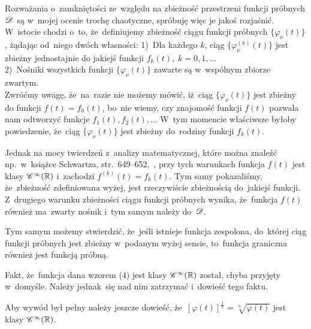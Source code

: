 \documentclass[a4paper,11pt]{article}
\begin{document}
\start {} Rozważania o~zamkniętości ze~względu na zbieżność
przestrzeni funkcji próbnych $\mathcal{D}$~są w~mojej ocenie trochę
chaotyczne, spróbuję więc je jakoś rozjaśnić. W~istocie chodzi o~to,
że~definiujemy zbieżność ciągu funkcji próbnych
$\{ \varphi_{ \nu }( t ) \}$, żądając od~niego dwóch własności:
1)~Dla każdego $k$, ciąg $\{ \varphi_{ \nu }^{ ( k ) }( t ) \}$ jest
zbieżny jednostajnie do jakiejś funkcji
$f_{ k }( t ), \; k = 0, 1, \ldots$ \\
2)~Nośniki wszystkich funkcji $\{ \varphi_{ \nu }( t ) \}$ zawarte są
w~wspólnym zbiorze zwartym. \\
Zwróćmy uwagę, że~na~razie nie możemy mówić, iż~ciąg
$\{ \varphi_{ \nu }( t ) \}$ jest zbieżny do funkcji
$f( t ) = f_{ 0 }( t )$, bo~nie wiemy, czy znajomość funkcji $f( t )$
pozwala nam odtworzyć funkcje $f_{ 1 }( t ), f_{ 2 }( t ), \ldots$ W~tym
momencie właściwsze byłoby powiedzenie, że~ciąg
$\{ \varphi_{ \nu }( t ) \}$ jest zbieżny do~rodziny funkcji
$f_{ k }( t )$.

Jednak na mocy twierdzeń z~analizy matematycznej, które można znaleźć
np.~w~książce Schwartza, str.~649--652,~\cite{SchwartzKursAnalizyMatematycznejVolI1979}, przy tych
warunkach funkcja $f( t )$ jest klasy $\mathcal{C}^{ \infty }( \mathbb{R} )$ i~zachodzi
$f^{ ( k ) }( t ) = f_{ k }( t )$. Tym samy pokazaliśmy, że~zbieżność
zdefiniowana wyżej, jest rzeczywiście zbieżnością do~jakiejś funkcji.
Z~drugiego warunku zbieżności ciągu funkcji próbnych wynika,
że~funkcja $f( t )$ również ma~zwarty nośnik i~tym samym należy
do~$\mathcal{D}$.

Tym samym możemy stwierdzić, że~jeśli istnieje funkcja zespolona,
do~której ciąg funkcji próbnych jest zbieżny w~podanym wyżej sensie,
to~funkcja graniczna również jest funkcją próbną.

\vspace{\spaceFour}



\start {} Fakt, że~funkcja dana wzorem (4) jest klasy
$\mathcal{C}^{ \infty }( \mathbb{R} )$ został, chyba przyjęty w~domyśle. Należy jednak~się
nad nim zatrzymać i~dowieść tego faktu. \Dok

\vspace{\spaceFour}



\start {} Aby wywód był pełny należy jeszcze dowieść,
że~$[ \varphi( t ) ]^{ \frac{ 1 }{ n } } = \sqrt[ n ]{ \varphi( t ) }$ jest
klasy $\mathcal{C}^{ \infty }( \mathbb{R} )$.

\vspace{\spaceFour}
\end{document}
